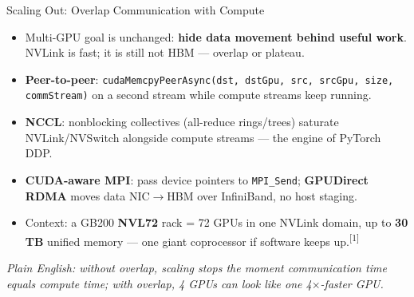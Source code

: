 \documentclass[aspectratio=169]{beamer}
\newcommand{\kw}[1]{\textbf{\textcolor{kwblue}{#1}}}
\newcommand{\pe}[1]{{\footnotesize\itshape Plain English: #1}}
\newcommand{\refmark}[1]{\textsuperscript{[#1]}}
\begin{document}
\begin{frame}{Scaling Out: Overlap Communication with Compute}
  \begin{itemize}
    \item Multi-GPU goal is unchanged: \kw{hide data movement behind useful work}.
          NVLink is fast; it is still not HBM --- overlap or plateau.
    \item \kw{Peer-to-peer}: \texttt{cudaMemcpyPeerAsync(dst, dstGpu, src, srcGpu, size, commStream)}
          on a second stream while compute streams keep running.
    \item \kw{NCCL}: nonblocking collectives (all-reduce rings/trees) saturate NVLink/NVSwitch
          alongside compute streams --- the engine of PyTorch DDP.
    \item \kw{CUDA-aware MPI}: pass device pointers to \texttt{MPI\_Send};
          \kw{GPUDirect RDMA} moves data NIC$\to$HBM over InfiniBand, no host staging.
    \item Context: a GB200 \kw{NVL72} rack = 72 GPUs in one NVLink domain, up to
          \kw{30 TB} unified memory --- one giant coprocessor if software keeps up.\refmark{1}
  \end{itemize}
  \medskip
  \pe{without overlap, scaling stops the moment communication time equals compute time; with overlap, 4 GPUs can look like one 4$\times$-faster GPU.}
\end{frame}
\end{document}
